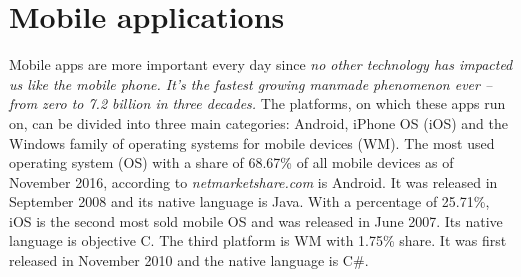 \section{Mobile applications} \label{analysisMobileApplications}
Mobile apps are more important every day since \textit{no other technology has impacted us like the mobile phone. It's the fastest growing manmade phenomenon ever -- from zero to 7.2 billion in three decades.}\cite{more-gadgets-on-earth-than-people} The platforms, on which these apps run on, can be divided into three main categories: Android, iPhone OS (iOS) and the Windows family of operating systems for mobile devices (WM). The most used operating system (OS) with a share of 68.67\% of all mobile devices as of November 2016, according to \textit{netmarketshare.com} \cite{operating-system-market-share} is Android. It was  released in September 2008 and its native language is Java. With a percentage of 25.71\%, iOS is the second most sold mobile OS and was released in June 2007. Its native language is objective C. The third platform is WM with 1.75\% share. It was first released in November 2010 and the native language is C\#. 

